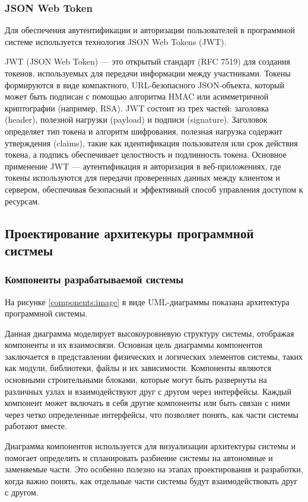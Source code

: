 \subsubsection{JSON Web Token}

Для обеспечения авутентификации и авторизации пользователей в программной системе используется технология JSON Web Tokens (JWT).

JWT (JSON Web Token) — это открытый стандарт (RFC 7519) для создания токенов, используемых для передачи информации между участниками. Токены формируются в виде компактного, URL-безопасного JSON-объекта, который может быть подписан с помощью алгоритма HMAC или асимметричной криптографии (например, RSA). JWT состоит из трех частей: заголовка (header), полезной нагрузки (payload) и подписи (signature). Заголовок определяет тип токена и алгоритм шифрования, полезная нагрузка содержит утверждения (claims), такие как идентификация пользователя или срок действия токена, а подпись обеспечивает целостность и подлинность токена. Основное применение JWT — аутентификация и авторизация в веб-приложениях, где токены используются для передачи проверенных данных между клиентом и сервером, обеспечивая безопасный и эффективный способ управления доступом к ресурсам.


\subsection{Проектирование архитекуры программной систмеы}

\subsubsection{Компоненты разрабатываемой системы}

На рисунке \ref{components:image} в виде UML-диаграммы показана архитектура программной системы.

Данная диаграмма моделирует высокоуровневую структуру системы, отображая компоненты и их взаимосвязи. Основная цель диаграммы компонентов заключается в представлении физических и логических элементов системы, таких как модули, библиотеки, файлы и их зависимости. Компоненты являются основными строительными блоками, которые могут быть развернуты на различных узлах и взаимодействуют друг с другом через интерфейсы. Каждый компонент может включать в себя другие компоненты или быть связан с ними через четко определенные интерфейсы, что позволяет понять, как части системы работают вместе\cite{uml}.

Диаграмма компонентов используется для визуализации архитектуры системы и помогает определить и спланировать разбиение системы на автономные и заменяемые части. Это особенно полезно на этапах проектирования и разработки, когда важно понять, как отдельные части системы будут взаимодействовать друг с другом.

